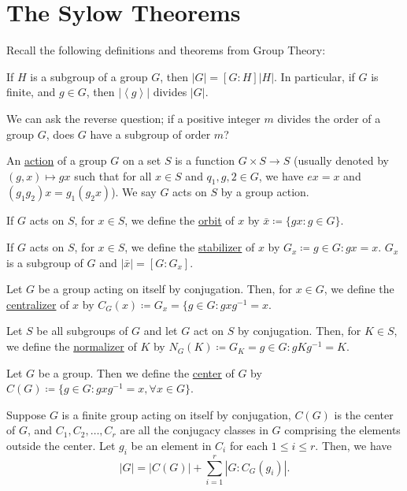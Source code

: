 \documentclass[11pt]{article}
\newcommand{\cyclic}[1]{\left\langle #1 \right\rangle}
\begin{document}
\pagebreak
\section{The Sylow Theorems}
Recall the following definitions and theorems from Group Theory:
\begin{theorem*}
If $H$ is a subgroup of a group $G$, then $|G| = [G:H]|H|$. In particular, if
$G$ is finite, and $g\in G$, then $|\cyclic{g}|$ divides $|G|$.
\end{theorem*}
We can ask the reverse question; if a positive integer $m$ divides the order of
a group $G$, does $G$ have a subgroup of order $m$?
\begin{definition}
An \underline{action} of a group $G$ on a set $S$ is a function $G\times S \to
S$ (usually denoted by $(g,x) \mapsto gx$ such that for all $x \in S$ and $q_1,
g,2 \in G$, we have $ex = x$ and $(g_1g_2)x = g_1(g_2x)$). We say $G$ acts on
$S$ by a group action.
\end{definition}
\begin{definition}
If $G$ acts on $S$, for $x \in S$, we define the \underline{orbit} of $x$ by
$\bar x \coloneqq \{gx : g \in G\}$.
\end{definition}
\begin{definition}
If $G$ acts on $S$, for $x \in S$, we define the \underline{stabilizer} of $x$
by $G_x \coloneqq {g \in G : gx = x}$. $G_x$ is a subgroup of $G$ and $|\bar x|
= [G:G_x]$.
\end{definition}
\begin{definition}
Let $G$ be a group acting on itself by conjugation. Then, for $x \in G$, we
define the \underline{centralizer} of $x$ by $C_G(x) \coloneqq G_x = \{g\in G:
gxg^{-1} = x$.
\end{definition}
\begin{definition}
Let $S$ be all subgroups of $G$ and let $G$ act on $S$ by conjugation. Then, for
$K \in S$, we define the \underline{normalizer} of $K$ by $N_G(K) \coloneqq G_K
= {g \in G:gKg^{-1} = K}$.
\end{definition}
\begin{definition}
Let $G$ be a group. Then we define the \underline{center} of $G$ by $C(G)
\coloneqq \{g \in G:gxg^{-1} = x, \forall x \in G\}$.
\end{definition}
\begin{theorem*}
Suppose $G$ is a finite group acting on itself by conjugation, $C(G)$ is the
center of $G$, and $C_1, C_2, \dots, C_r$ are all the conjugacy classes in $G$
comprising the elements outside the center. Let $g_i$ be an element in $C_i$ for
each $1 \leq i \leq r$. Then, we have
\begin{equation*}
|G| = |C(G)| + \sum^r_{i=1}|G:C_G(g_i)|.
\end{equation*}
\end{theorem*}
\end{document}
